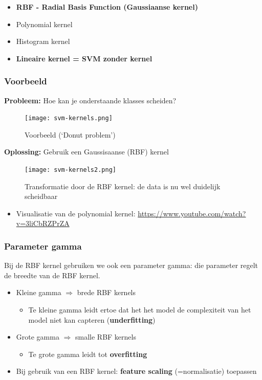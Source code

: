 \documentclass{article}
\begin{document}
\begin{itemize}
    \item \textbf{RBF - Radial Basis Function (Gaussiaanse kernel)}
    \item Polynomial kernel
    \item Histogram kernel
    \item \textbf{Lineaire kernel = SVM zonder kernel}
\end{itemize}

\subsubsection{Voorbeeld}

\textbf{Probleem:} Hoe kan je onderstaande klasses scheiden?

\begin{figure}[H]
    \centering
    \texttt{[image: svm-kernels.png]}
    \caption{Voorbeeld (`Donut problem')}
\end{figure}

\textbf{Oplossing:} Gebruik een Gaussisaanse (RBF) kernel

\begin{figure}[H]
    \centering
    \texttt{[image: svm-kernels2.png]}
    \caption{Transformatie door de RBF kernel: de data is nu wel duidelijk scheidbaar}
\end{figure}

\begin{itemize}
    \item Visualisatie van de polynomial kernel: \url{https://www.youtube.com/watch?v=3liCbRZPrZA}
\end{itemize}

\subsubsection{Parameter gamma}

Bij de RBF kernel gebruiken we ook een parameter gamma: die parameter 
regelt de breedte van de RBF kernel.

\begin{itemize}
    \item Kleine gamma $\Rightarrow$ brede RBF kernels
    \begin{itemize}
        \item Te kleine gamma leidt ertoe dat het het model de complexiteit van het model niet kan capteren (\textbf{underfitting})
    \end{itemize}
    \item Grote gamma $\Rightarrow$ smalle RBF kernels
    \begin{itemize}
        \item Te grote gamma leidt tot \textbf{overfitting}
    \end{itemize}
    \item Bij gebruik van een RBF kernel: \textbf{feature scaling} (=normalisatie) toepassen
\end{itemize}
\end{document}
